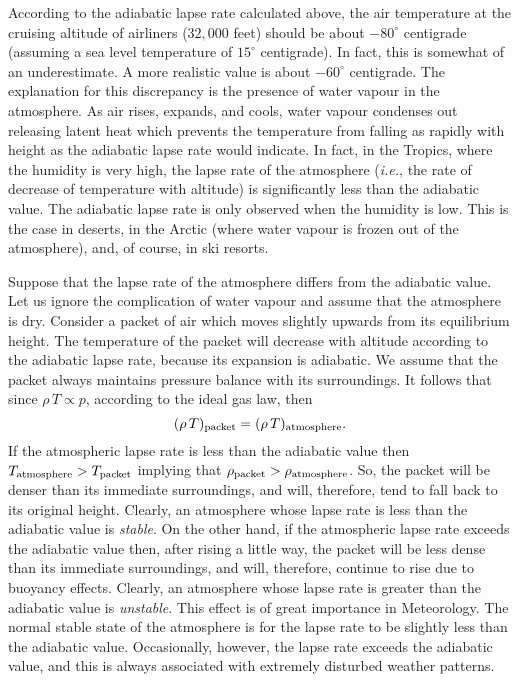 According to the adiabatic lapse rate calculated above,  the air temperature at
the cruising altitude of airliners ($32,000$ feet) should be about $-80^\circ$
centigrade (assuming a sea level temperature of $15^\circ$ centigrade). 
In fact, this is somewhat of an underestimate. A more realistic value is about
$-60^\circ$ centigrade. 
The explanation for  this 
discrepancy is the presence of 
water vapour in the atmosphere. As  air rises, expands, and cools, water
vapour condenses out releasing latent heat which prevents the temperature
from falling as rapidly with height as the adiabatic lapse rate would indicate.
In fact, in the Tropics, where the humidity is very high, the lapse rate of
the atmosphere ({\em i.e.}, the rate of decrease of temperature with altitude)
 is significantly less than the adiabatic value. The adiabatic
lapse rate is only observed when the humidity is low. This is the case in deserts,
in the Arctic (where water vapour is frozen out of the atmosphere), and, of course,
in ski resorts.

Suppose that the lapse rate of the atmosphere differs  from the adiabatic value.
Let us ignore the complication of water vapour and assume that the atmosphere
is dry. Consider a packet of air which moves slightly upwards
from its equilibrium height. The temperature of the packet will
decrease with altitude according to the adiabatic lapse rate, because its
expansion is adiabatic. We assume that the packet  always maintains pressure
balance with its surroundings. It follows that since $\rho\, T \propto p$,
according to the ideal gas law, then
\begin{equation}
(\rho\, T)_{\rm packet} = (\rho \,T)_{\rm atmosphere}.
\end{equation}
If the atmospheric lapse rate is less than the adiabatic value then 
$T_{\rm atmosphere} > T_{\rm packet}$ implying that $\rho_{\rm packet} > 
\rho_{\rm atmosphere}$. So, the packet will be denser than its immediate
surroundings, and will, therefore, tend to fall back to its original height.
Clearly, an atmosphere whose lapse rate is less than the adiabatic value is
{\em stable}. On the other hand, if the atmospheric lapse rate exceeds the adiabatic
value then, after rising a little way, 
 the packet will be less dense than its immediate surroundings, and will, therefore,
continue to rise due to buoyancy effects. 
Clearly, an atmosphere whose lapse rate is greater
than the adiabatic value is {\em unstable}. This effect is of great importance
in Meteorology. The normal stable state of the atmosphere is for the lapse rate
to be slightly less than
 the adiabatic value. Occasionally, however, the lapse rate exceeds
the adiabatic value, and this is always associated with
 extremely disturbed weather patterns.

